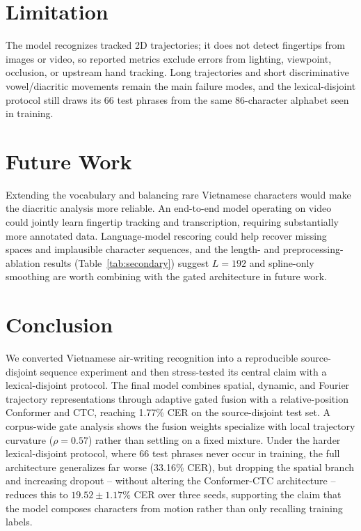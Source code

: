 \documentclass[runningheads]{llncs}
\begin{document}
\FloatBarrier
\section{Limitation}
The model recognizes tracked 2D trajectories; it does not detect fingertips from images or video, so reported metrics exclude errors from lighting, viewpoint, occlusion, or upstream hand tracking. Long trajectories and short discriminative vowel/diacritic movements remain the main failure modes, and the lexical-disjoint protocol still draws its 66 test phrases from the same 86-character alphabet seen in training.

\section{Future Work}
Extending the vocabulary and balancing rare Vietnamese characters would make the diacritic analysis more reliable. An end-to-end model operating on video could jointly learn fingertip tracking and transcription, requiring substantially more annotated data. Language-model rescoring could help recover missing spaces and implausible character sequences, and the length- and preprocessing-ablation results (Table~\ref{tab:secondary}) suggest $L=192$ and spline-only smoothing are worth combining with the gated architecture in future work.

\section{Conclusion}
We converted Vietnamese air-writing recognition into a reproducible source-disjoint sequence experiment and then stress-tested its central claim with a lexical-disjoint protocol. The final model combines spatial, dynamic, and Fourier trajectory representations through adaptive gated fusion with a relative-position Conformer and CTC, reaching 1.77\% CER on the source-disjoint test set. A corpus-wide gate analysis shows the fusion weights specialize with local trajectory curvature ($\rho=0.57$) rather than settling on a fixed mixture. Under the harder lexical-disjoint protocol, where 66 test phrases never occur in training, the full architecture generalizes far worse (33.16\% CER), but dropping the spatial branch and increasing dropout -- without altering the Conformer-CTC architecture -- reduces this to $19.52\pm1.17\%$ CER over three seeds, supporting the claim that the model composes characters from motion rather than only recalling training labels.
\end{document}
